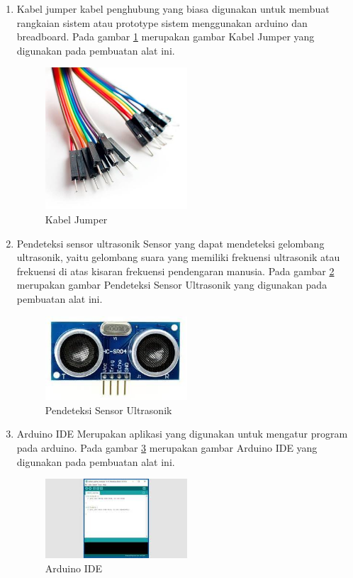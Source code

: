 \begin{enumerate}
\item Kabel jumper 
\subitem kabel penghubung yang biasa digunakan untuk membuat rangkaian sistem atau prototype sistem 	menggunakan arduino dan breadboard. Pada gambar \ref{labelgambar3} merupakan gambar Kabel Jumper yang digunakan pada pembuatan alat ini.
	\begin{figure}[htbp]
	\centering
	\includegraphics[width=0.5\textwidth]{figures/ALAT_PENDETEKSI_BANJIR/kabel_jumper_1c}
	\caption{Kabel Jumper}
	\label{labelgambar3}
	\end{figure}

\item Pendeteksi sensor ultrasonik
\subitem Sensor yang dapat mendeteksi gelombang ultrasonik, yaitu gelombang suara yang memiliki frekuensi ultrasonik atau frekuensi di atas kisaran frekuensi pendengaran manusia. Pada gambar \ref{labelgambar4} merupakan gambar Pendeteksi Sensor Ultrasonik yang digunakan pada pembuatan alat ini.
	\begin{figure}[htbp]
	\centering
	\includegraphics[width=0.5\textwidth]{figures/ALAT_PENDETEKSI_BANJIR/pendeteksi_sensor_ultrasonik_1c}
	\caption{Pendeteksi Sensor Ultrasonik}
	\label{labelgambar4}
	\end{figure}

\item Arduino IDE
\subitem Merupakan aplikasi yang digunakan untuk mengatur program pada arduino. Pada gambar \ref{labelgambar5} merupakan gambar Arduino IDE yang digunakan pada pembuatan alat ini.
	\begin{figure}[htbp]
	\centering
	\includegraphics[width=0.5\textwidth]{figures/ALAT_PENDETEKSI_BANJIR/arduino_IDE_1c}
	\caption{Arduino IDE}
	\label{labelgambar5}
	\end{figure}


\end{enumerate}
